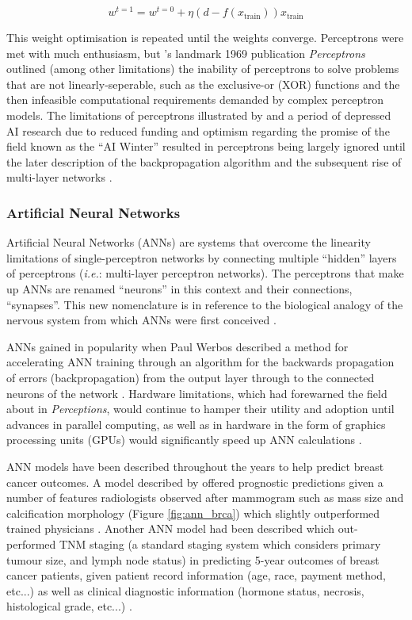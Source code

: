 $$w^{t=1} = w^{t=0} + \eta\left(d-f\left(x_{\textrm{train}}\right)\right)x_{\textrm{train}}$$

This weight optimisation is repeated until the weights converge. Perceptrons were met with much enthusiasm, but \citeauthor{minsky1969}'s landmark 1969 publication \textit{Perceptrons} outlined (among other limitations) the inability of perceptrons to solve problems that are not linearly-seperable, such as the exclusive-or (XOR) functions and the then infeasible computational requirements demanded by complex perceptron models. The limitations of perceptrons illustrated by \citeauthor{minsky1969} and a period of depressed AI research due to reduced funding and optimism regarding the promise of the field known as the ``AI Winter'' resulted in perceptrons being largely ignored until the later description of the backpropagation algorithm and the subsequent rise of multi-layer networks \citep{hendler2008}.

\subsubsection{Artificial Neural Networks}

Artificial Neural Networks (ANNs) are systems that overcome the linearity limitations of single-perceptron networks by connecting multiple ``hidden'' layers of perceptrons (\textit{i.e.}: multi-layer perceptron networks). The perceptrons that make up ANNs are renamed ``neurons'' in this context and their connections, ``synapses''. This new nomenclature is in reference to the biological analogy of the nervous system from which ANNs were first conceived \citep{kleene1956}.

ANNs gained in popularity when Paul Werbos described a method for accelerating ANN training through an algorithm for the backwards propagation of errors (backpropagation) from the output layer through to the connected neurons of the network \citep{werbos1982}. Hardware limitations, which \citeauthor{minsky1969} had forewarned the field about in \textit{Perceptions}, would continue to hamper their utility and adoption until advances in parallel computing, as well as in hardware in the form of graphics processing units (GPUs) would significantly speed up ANN calculations \citep{simard2005, zhongwen2005}.

ANN models have been described throughout the years to help predict breast cancer outcomes. A model described by \citeauthor{floyd1994} offered prognostic predictions given a number of features radiologists observed after mammogram such as mass size and calcification morphology (Figure \ref{fig:ann_brca}) which slightly outperformed trained physicians \citep{floyd1994}. Another ANN model had been described which out-performed TNM staging (a standard staging system which considers primary tumour size, and lymph node status) in predicting 5-year outcomes of breast cancer patients, given patient record information (age, race, payment method, etc...) as well as clinical diagnostic information (hormone status, necrosis, histological grade, etc...) \citep{burke1997}.


